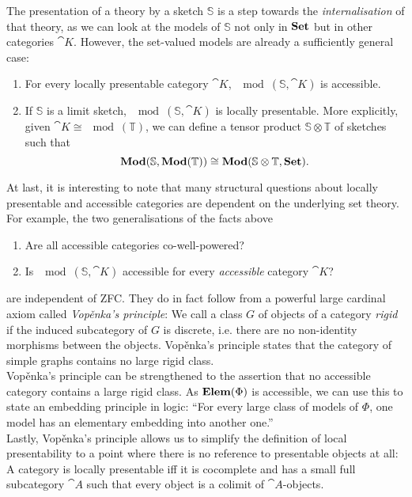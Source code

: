 The presentation of a theory by a sketch $\mathbb S$ is a step towards the \emph{internalisation} of that theory, as we can look at the models of $\mathbb S$ not only in $\mathbf{Set}$ but in other categories $\cat K$. However, the set-valued models are already a sufficiently general case:
\begin{enumerate}[resume]
\item For every locally presentable category $\cat K$, $\mod(\mathbb S, \cat K)$ is accessible.
\item If $\mathbb S$ is a limit sketch, $\mod(\mathbb S, \cat K)$ is locally presentable. More explicitly, given $\cat K \cong \mod(\mathbb T)$, we can define a tensor product $\mathbb S \otimes \mathbb T$ of sketches such that 
\[ \mathbf{Mod}(\mathbb S, \mathbf{Mod}(\mathbb T)) \cong \mathbf{Mod}(\mathbb S \otimes \mathbb T, \mathbf{Set}). \] 
\end{enumerate}

At last, it is interesting to note that many structural questions about locally presentable and accessible categories are dependent on the underlying set theory. For example, the two generalisations of the facts above 

\begin{enumerate}[resume]
\item Are all accessible categories co-well-powered?
\item Is $\mod(\mathbb S, \cat K)$ accessible for every \emph{accessible} category $\cat K$?
\end{enumerate} 

are independent of ZFC. They do in fact follow from a powerful large cardinal axiom called \emph{Vopěnka's principle}: We call a class $G$ of objects of a category \emph{rigid} if the induced subcategory of $G$ is discrete, i.e. there are no non-identity morphisms between the objects. Vopěnka's principle states that the category of simple graphs contains no large rigid class. \\

Vopěnka's principle can be strengthened to the assertion that no accessible category contains a large rigid class. As $\mathbf{Elem}(\Phi)$ is accessible, we can use this to state an embedding principle in logic: ``For every large class of models of $\Phi$, one model has an elementary embedding into another one.'' \\

Lastly, Vopěnka's principle allows us to simplify the definition of local presentability to a point where there is no reference to presentable objects at all: A category is locally presentable iff it is cocomplete and has a small full subcategory $\cat A$ such that every object is a colimit of $\cat A$-objects.